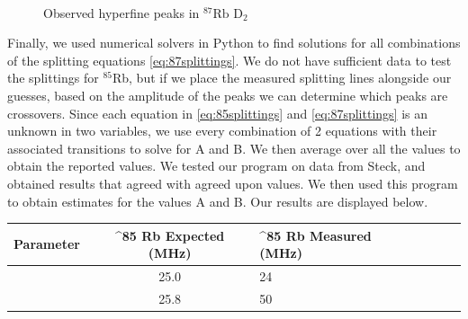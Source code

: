 \documentclass[12pt]{article}
\begin{document}
\begin{figure}[ht!]
\begin{center}
{		}\\%
	\end{center}
	\caption{%
		Observed hyperfine peaks in ${}^{87}\text{Rb D}_2$
	}%
	\label{fig:87Hyperfine}
\end{figure}

Finally, we used numerical solvers in Python to find solutions for all combinations of the splitting equations \ref{eq:87splittings}.  We do not have sufficient data to test the splittings for $^{85}$Rb, but if we place the measured splitting lines alongside our guesses, based on the amplitude of the peaks we can determine which peaks are crossovers.  Since each equation in \ref{eq:85splittings} and \ref{eq:87splittings} is an unknown in two variables, we use every combination of 2 equations with their associated transitions to solve for A and B.  We then average over all the values to obtain the reported values.  We tested our program on data from Steck\cite{steck85Rb}\cite{steck87Rb}, and obtained results that agreed with agreed upon values.  We then used this program to obtain estimates for the values A and B.  Our results are displayed below.

\begin{center}
	\begin{tabular}{| L|c | L|c |L|c|}
		\hline
		\textbf{Parameter} & {}^{85}\textbf{ Rb Expected (MHz)} & {}^{85}\textbf{ Rb Measured (MHz)}\\ 
		\hline
		 & 25.0 &  24\\ 
		\hline
		 & 25.8 & 50\\ 
		\hline
	\end{tabular}
\end{center}
\end{document}
